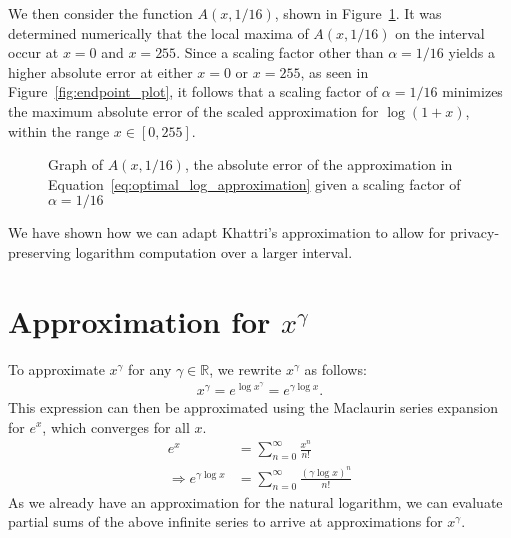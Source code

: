 We then consider the function $A\left(x,1/16\right)$, shown in Figure~\ref{fig:single_alpha_plot}.
It was determined numerically that the local maxima of $A\left(x,1/16\right)$ on the interval occur at $x=0$ and $x=255$. Since a scaling factor other than $\alpha=1/16$ yields a higher absolute error at either $x=0$ or $x=255$, as seen in Figure~\ref{fig:endpoint_plot}, it follows that a scaling factor of $\alpha = 1/16$ minimizes the maximum absolute error of the scaled approximation for $\log{\left(1+x\right)}$, within the range $x \in [0, 255]$.
\begin{figure}[ht]
	\centering
	\caption{Graph of $A\left(x,1/16\right)$, the absolute error of the approximation in Equation~\ref{eq:optimal_log_approximation} given a scaling factor of $\alpha=1/16$}
	\label{fig:single_alpha_plot}
\end{figure}

We have shown how we can adapt Khattri's approximation to allow for privacy-preserving logarithm computation over a larger interval.

\section{Approximation for $x^\gamma$}
To approximate $x^\gamma$ for any $\gamma \in \mathbb{R}$, we rewrite $x^\gamma$ as follows:
\begin{align*}
  x^\gamma = e^{\log{x^\gamma}} = e^{\gamma\log{x}}.
\end{align*}
This expression can then be approximated using the Maclaurin series expansion for $e^x$, which converges for all $x$.
\begin{align*}
  e^x &= \sum_{n=0}^{\infty}{\frac{x^n}{n!}}\\
  \Rightarrow e^{\gamma\log{x}} &= \sum_{n=0}^{\infty}{\frac{(\gamma\log{x})^n}{n!}}
\end{align*}
As we already have an approximation for the natural logarithm, we can evaluate partial sums of the above infinite series to arrive at approximations for $x^\gamma$.
